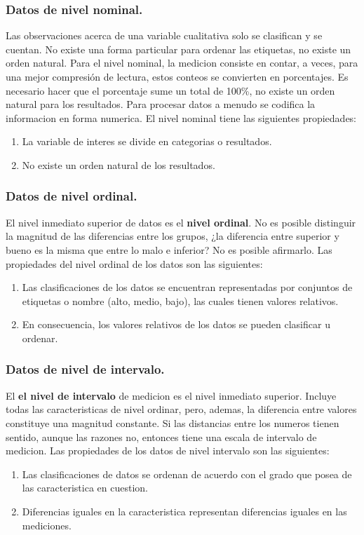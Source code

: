 \documentclass[]{article}
\begin{document}
\subsubsection*{Datos de nivel nominal.}
Las observaciones acerca de una variable cualitativa solo se clasifican y se cuentan. No existe una forma particular para ordenar las etiquetas, no existe un orden natural. Para el nivel nominal, la medicion consiste en contar, a veces, para una mejor compresión de lectura, estos conteos se convierten en porcentajes. Es necesario hacer que el porcentaje sume un total de 100\%, no existe un orden natural para los resultados. Para procesar datos a menudo se codifica la informacion en forma numerica. El nivel nominal tiene las siguientes propiedades:
\begin{enumerate}
	\item La variable de interes se divide en categorias o resultados.
	\item No existe un orden natural de los resultados.
\end{enumerate}

\subsubsection*{Datos de nivel ordinal.}
El nivel inmediato superior de datos es el \textbf{nivel ordinal}. No es posible distinguir la magnitud de las diferencias entre los grupos, ¿la diferencia entre superior y bueno es la misma que entre lo malo e inferior? No es posible afirmarlo. Las propiedades del nivel ordinal de los datos son las siguientes:
\begin{enumerate}
	\item Las clasificaciones de los datos se encuentran representadas por conjuntos de etiquetas o nombre (alto, medio, bajo), las cuales tienen valores relativos.
	\item En consecuencia, los valores relativos de los datos se pueden clasificar u ordenar.
\end{enumerate}

\subsubsection*{Datos de nivel de intervalo.}
El \textbf{el nivel de intervalo} de medicion es el nivel inmediato superior. Incluye todas las caracteristicas de nivel ordinar, pero, ademas, la diferencia entre valores constituye una magnitud constante. Si las distancias entre los numeros tienen sentido, aunque las razones no, entonces tiene una escala de intervalo de medicion. Las propiedades de los datos de nivel intervalo son las siguientes:
\begin{enumerate}
	\item Las clasificaciones de datos se ordenan de acuerdo con el grado que posea de las caracteristica en cuestion.
	\item Diferencias iguales en la caracteristica representan diferencias iguales en las mediciones.
\end{enumerate}
\end{document}
